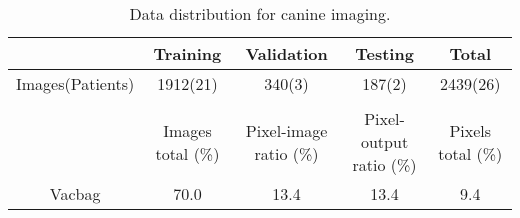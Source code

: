 \begin{table}[H]
\footnotesize
\caption{Data distribution for canine imaging.}
\centering
\begin{tabular}{c c c c c}
\hline\hline
& Training & Validation & Testing & Total  \\ [0.5ex]
\hline

Images(Patients) & 1912(21) & 340(3) & 187(2) & 2439(26) \\
 \\
 \hline\hline
		 & Images total (\%) & Pixel-image ratio (\%)& Pixel-output ratio (\%) & Pixels total (\%)\\ [0.5ex]
\hline
Vacbag   & 70.0& 13.4  & 13.4  &  9.4 \\

\hline\hline
\end{tabular}
\label{table:data_vet}
\end{table}
